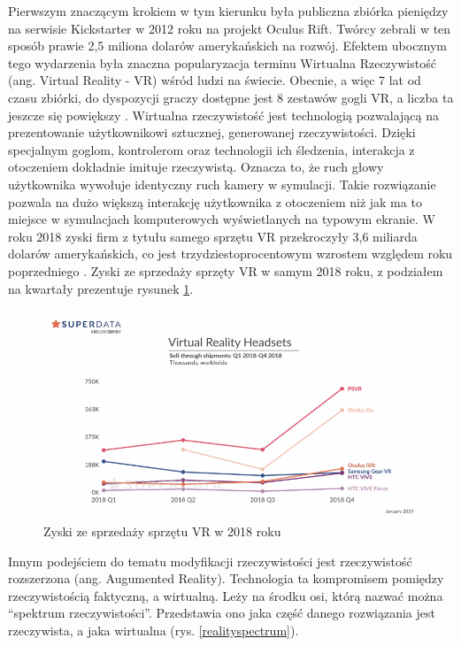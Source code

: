 \documentclass[12pt,twoside,polish]{article}
\begin{document}
Pierwszym znaczącym krokiem w tym kierunku była publiczna zbiórka pieniędzy na serwisie Kickstarter w 2012 roku na projekt Oculus Rift. Twórcy zebrali w ten sposób prawie 2,5 miliona dolarów amerykańskich na rozwój. Efektem ubocznym tego wydarzenia była znaczna popularyzacja terminu Wirtualna Rzeczywistość (ang. Virtual Reality - VR) wśród ludzi na świecie. Obecnie, a więc 7 lat od czasu zbiórki, do dyspozycji graczy dostępne jest 8 zestawów gogli VR, a liczba ta jeszcze się powiększy \cite{steamvr}. Wirtualna rzeczywistość jest technologią pozwalającą na prezentowanie użytkownikowi sztucznej, generowanej rzeczywistości. Dzięki specjalnym goglom, kontrolerom oraz technologii ich śledzenia, interakcja z otoczeniem dokładnie imituje rzeczywistą. Oznacza to, że ruch głowy użytkownika wywołuje identyczny ruch kamery w symulacji. Takie rozwiązanie pozwala na dużo większą interakcję użytkownika z otoczeniem niż jak ma to miejsce w symulacjach komputerowych wyświetlanych na typowym ekranie. W roku 2018 zyski firm z tytułu samego sprzętu VR przekroczyły 3,6 miliarda dolarów amerykańskich, co jest trzydziestoprocentowym wzrostem względem roku poprzedniego \cite{vr2018}. Zyski ze sprzedaży sprzęty VR w samym 2018 roku, z podziałem na kwartały prezentuje rysunek \ref{vrincome}.

\begin{figure}
	\centering
	\includegraphics[width=\textwidth]{vr2018}
	\caption{Zyski ze sprzedaży sprzętu VR w 2018 roku \cite{vr2018img}}
	\label{vrincome}
\end{figure}

Innym podejściem do tematu modyfikacji rzeczywistości jest rzeczywistość rozszerzona (ang. Augumented Reality). Technologia ta kompromisem pomiędzy rzeczywistością faktyczną, a wirtualną. Leży na środku osi, którą nazwać można \enquote{spektrum rzeczywistości}. Przedstawia ono jaka część danego rozwiązania jest rzeczywista, a jaka wirtualna (rys. \ref{realityspectrum}).
\end{document}
